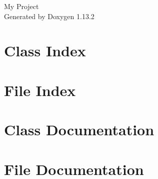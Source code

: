 \documentclass[twoside]{book}
\newcommand{\+}{\discretionary{\mbox{\scriptsize$\hookleftarrow$}}{}{}}
\newcommand{\clearemptydoublepage}{%
    \newpage{\pagestyle{empty}\cleardoublepage}%
  }
\begin{document}
  \raggedbottom
    \hypersetup{pageanchor=false,
                bookmarksnumbered=true,
                pdfencoding=unicode
               }
  \begin{titlepage}
  \vspace*{7cm}
  \begin{center}%
  {\Large My Project}\\
  \vspace*{1cm}
  {\large Generated by Doxygen 1.13.2}\\
  \end{center}
  \end{titlepage}
  \clearemptydoublepage
  \tableofcontents
  \clearemptydoublepage
  \hypersetup{pageanchor=true}
\chapter{Class Index}

\chapter{File Index}

\chapter{Class Documentation}

\chapter{File Documentation}

  \backmatter
  \newpage
  \clearemptydoublepage
  \printindex
\end{document}
